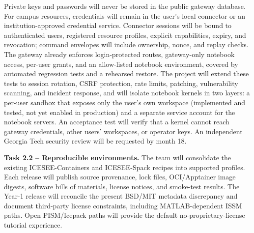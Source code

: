 Private keys and passwords will never be stored in the public gateway
database. For campus resources, credentials will remain in the user's local
connector or an institution-approved credential service. Connector sessions
will be bound to authenticated users, registered resource profiles, explicit
capabilities, expiry, and revocation; command envelopes will include ownership,
nonce, and replay checks.
The gateway already enforces login-protected routes, gateway-only notebook
access, per-user grants, and an allow-listed notebook environment, covered by
automated regression tests and a rehearsed restore. The project will extend
these tests to session rotation, CSRF protection, rate limits, patching,
vulnerability scanning, and incident response, and will isolate notebook
kernels in two layers: a per-user sandbox that exposes only the user's own
workspace (implemented and tested, not yet enabled in production) and a
separate service account for the notebook servers. An acceptance test will
verify that a kernel cannot reach gateway credentials, other users'
workspaces, or operator keys. An independent Georgia Tech security review will
be requested by month 18.

\textbf{Task 2.2 -- Reproducible environments.} The team will consolidate the
existing ICESEE-Containers and ICESEE-Spack recipes into supported profiles.
Each release will publish source provenance, lock files, OCI/Apptainer image
digests, software bills of materials, license notices, and smoke-test results.
The Year-1 release will reconcile the present BSD/MIT metadata discrepancy and
document third-party license constraints, including MATLAB-dependent ISSM
paths. Open PISM/Icepack paths will provide the default no-proprietary-license
tutorial experience.

